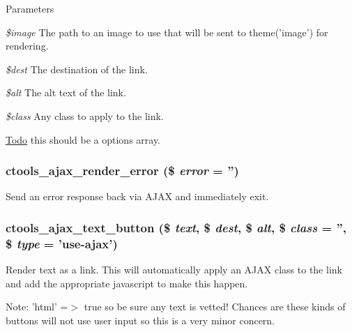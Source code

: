 \begin{DoxyParams}{Parameters}
\item[{\em \$image}]The path to an image to use that will be sent to theme('image') for rendering. \item[{\em \$dest}]The destination of the link. \item[{\em \$alt}]The alt text of the link. \item[{\em \$class}]Any class to apply to the link. \end{DoxyParams}
\begin{Desc}
\item[\hyperlink{todo__todo000004}{Todo}]this should be a options array. \end{Desc}
\hypertarget{ctools_2includes_2ajax_8inc_ab41cb38da1e7523e8697f9197cc6244e}{
\subsubsection[{ctools\_\-ajax\_\-render\_\-error}]{\setlength{\rightskip}{0pt plus 5cm}ctools\_\-ajax\_\-render\_\-error (\$ {\em error} = {\ttfamily ''})}}
\label{ctools_2includes_2ajax_8inc_ab41cb38da1e7523e8697f9197cc6244e}
Send an error response back via AJAX and immediately exit. \hypertarget{ctools_2includes_2ajax_8inc_aa20aff28acfb85cc21e49727d3126aad}{
\subsubsection[{ctools\_\-ajax\_\-text\_\-button}]{\setlength{\rightskip}{0pt plus 5cm}ctools\_\-ajax\_\-text\_\-button (\$ {\em text}, \/  \$ {\em dest}, \/  \$ {\em alt}, \/  \$ {\em class} = {\ttfamily ''}, \/  \$ {\em type} = {\ttfamily 'use-\/ajax'})}}
\label{ctools_2includes_2ajax_8inc_aa20aff28acfb85cc21e49727d3126aad}
Render text as a link. This will automatically apply an AJAX class to the link and add the appropriate javascript to make this happen.

Note: 'html' =$>$ true so be sure any text is vetted! Chances are these kinds of buttons will not use user input so this is a very minor concern.


